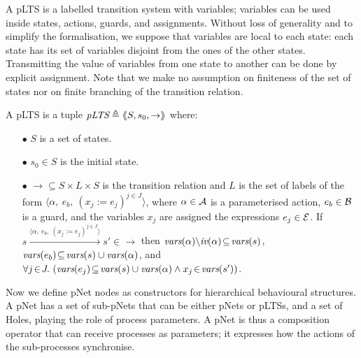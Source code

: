 \documentclass{lncs/llncs}
\newcommand{\LUDO}[1]{\textcolor{darkgreen}{#1}}
\begin{document}


A pLTS is a labelled transition system with variables; variables can be
used inside states, actions, guards, and
assignments. Without loss of generality and to simplify the formalisation, we suppose 
 that variables are local to each 
state: each state has its set of variables disjoint from the ones of the other states. Transmitting the value of
variables from one state to another can be done by explicit assignment. 
Note that we make no assumption on finiteness of the set of states nor
on finite branching of the transition relation.

\begin{definition}[pLTS]
\label{pLTS}
A pLTS is a tuple
$\pLTS\triangleq\mylangle S,s_0, \to\myrangle$ where:
\begin{itemize}
\item[$\bullet$]
$S$ is a set of states.
\item[$\bullet$]
$s_0 \in S$ is the initial state.
\item[$\bullet$] $\to \subseteq S \times L \times S$ is the transition relation and 
$L$ is the set of labels of the form
$\langle \alpha,~e_b,~(x_j\!:= {e}_j)^{j\in J}\rangle$,
where $\alpha \in\mathcal{A}$ is a parameterised action, $e_b \in
\mathcal{B}$ is a guard, and the variables $x_j$ 
are assigned the expressions $e_j\in \mathcal{E}$.
If 
$s \xrightarrow{\langle \alpha,~e_b,~(x_j\!:= {e}_j)^{j\in
		J}\rangle} s'\in \to $ then 
		$\vars(\alpha)\backslash \iv(\alpha)\!\subseteq\! \vars(s)$, 
		$\vars(e_b)\!\subseteq\! \vars(s)\cup\vars(\alpha)$, and
		$\forall j\!\in\! J .\,\left(\vars(e_j)\!\subseteq\! \vars(s)\cup\vars(\alpha)\land 
		x_j\!\in\!\vars(s') \right)$. %
\end{itemize}
\end{definition}

Now we define
pNet nodes as constructors for hierarchical behavioural structures.
A pNet has a set of sub-pNets that can be either pNets or pLTSs, and a
set of Holes, playing the role of process parameters. A pNet is thus a composition operator that can receive processes as parameters; it expresses how the actions of the sub-processes synchronise.
\end{document}
